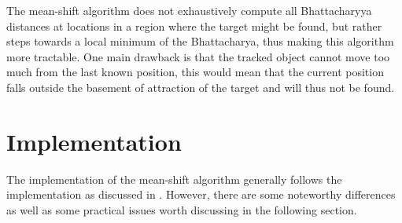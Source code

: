 \documentclass[a4paper,11pt]{article}
\begin{document}
The mean-shift algorithm does not exhaustively compute all Bhattacharyya distances at locations in a region where the target might be found, but rather steps towards a local minimum of the Bhattacharya, thus making this algorithm more tractable. One main drawback is that the tracked object cannot move too much from the last known position, this would mean that the current position falls outside the basement of attraction of the target and will thus not be found. 










	
















\section{Implementation}
The implementation of the mean-shift algorithm generally follows the implementation as discussed in \cite{mean_shift}. However, there are some noteworthy differences as well as some practical issues worth discussing in the following section. 
\end{document}
